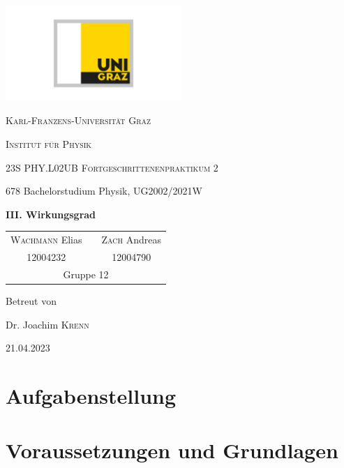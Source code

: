 \documentclass[english, ngerman]{scrartcl}
\begin{document}
\begin{titlepage}
    \centering
    \includegraphics[width=0.5\textwidth]{../../99_Misc/Logo_KF.pdf}\par\vspace{0.8cm}
    {\scshape\LARGE{Karl-Franzens-Universität Graz}\par}
    {\scshape\LARGE{Institut für Physik}\par}
    \vspace{1cm}
    {\scshape\Large{23S PHY.L02UB Fortgeschrittenenpraktikum 2}\par}
    678 Bachelorstudium Physik, UG2002/2021W\par
    \vspace{1.5cm}
    {\huge\bfseries III. Wirkungsgrad\par}
    \vspace{2cm}
    \begin{table}[H]
        \centering
        \begin{tabular}{c c c}
            \Large \textsc{Wachmann} Elias &  & \Large \textsc{Zach} Andreas \\
            \Large 12004232                &  & \Large 12004790              \\
            \multicolumn{3}{c}{Gruppe 12}
        \end{tabular}
    \end{table}
    \vfill
    \Large Betreut von\par
    Dr. Joachim \textsc{Krenn}
    \vfill
    {\large 21.04.2023\par}
\end{titlepage}

\clearpage
\tableofcontents
\newpage

\section[Aufgabenstellung]{Aufgabenstellung \cite{ref:angabe}}
\label{sec:aufgabenstellung}




\section[Voraussetzungen und Grundlagen]{Voraussetzungen und Grundlagen \cite{ref:angabe}}
\end{document}
